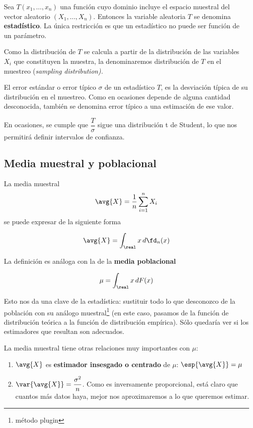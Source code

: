 \documentclass{apuntes}
\begin{document}
\begin{defn}[Estadístico]
Sea $T(x_1,\dotsc,x_n)$ una función cuyo dominio incluye el espacio muestral del vector aleatorio $(X_1, \dotsc, X_n)$. Entonces la variable aleatoria $T$ se denomina \textbf{estadístico}. La única restricción es que un estadístico no puede ser función de un parámetro.
\end{defn}

Como la distribución de $T$ se calcula a partir de la distribución de las variables $X_i$ que constituyen la muestra, la denominaremos distribución de $T$ en el muestreo (\textit{sampling distribution).}

\begin{defn}
El error estándar o error típico $\sigma$ de un estadístico $T$, es la desviación típica de su distribución en el muestreo. Como en ocasiones depende de alguna cantidad desconocida, también se denomina error típico a una estimación de ese valor.
\end{defn}

En ocasiones, se cumple que $\dfrac{T}{\sigma}$ sigue una distribución t de Student, lo que nos permitirá definir intervalos de confianza.

\subsection{Media muestral y poblacional}

\begin{defn} La media muestral \[ \avg{X} = \frac{1}{n}\sum_{i=1}^n X_i \] se puede expresar de la siguiente forma

\[ \avg{X} = \int_\real x\,d\fd_n(x) \]
\end{defn}

La definición es análoga con la de la \textbf{media poblacional}

\[ \mu = \int_\real x \,dF(x) \]

Esto nos da una clave de la estadística: sustituir todo lo que desconozco de la población con su análogo muestral\footnote{método plugin} (en este caso, pasamos de la función de distribución teórica a la función de distribución empírica). Sólo quedaría ver si los estimadores que resultan son adecuados.

\newpage
La media muestral tiene otras relaciones muy importantes con $\mu$:

\begin{enumerate}
\item $\avg{X}$ es  \textbf{estimador insesgado o centrado} de $\mu$: $ \esp{\avg{X}} = \mu $
\item $\var{\avg{X}} = \dfrac{\sigma^2}{n}$. Como es inversamente proporcional, está claro que cuantos más datos haya, mejor nos aproximaremos a lo que queremos estimar.
\end{enumerate}
\end{document}
